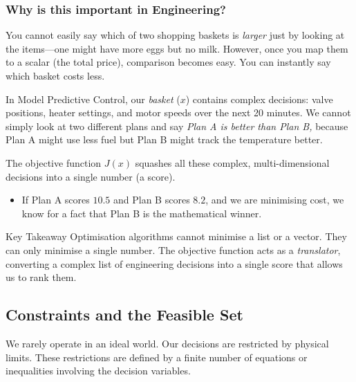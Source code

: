 \subsubsection*{Why is this important in Engineering?}

You cannot easily say which of two shopping baskets is \emph{larger} just by looking at the items—one might have more eggs but no milk. However, once you map them to a {scalar} (the total price), comparison becomes easy. You can instantly say which basket costs less.

In Model Predictive Control, our \emph{basket} ($x$) contains complex decisions: valve positions, heater settings, and motor speeds over the next 20 minutes. We cannot simply look at two different plans and say \emph{Plan A is better than Plan B,} because Plan A might use less fuel but Plan B might track the temperature better.

The objective function $J(x)$ squashes all these complex, multi-dimensional decisions into a single number (a score). 
\begin{itemize}
	\item If Plan A scores $10.5$ and Plan B scores $8.2$, and we are minimising cost, we know for a fact that {Plan B is the mathematical winner}.
\end{itemize}

\begin{notebox}{Key Takeaway}
	Optimisation algorithms cannot minimise a list or a vector. They can only minimise a single number. The objective function acts as a \emph{translator}, converting a complex list of engineering decisions into a single score that allows us to rank them.
\end{notebox}

\subsection{Constraints and the Feasible Set}


We rarely operate in an ideal world. Our decisions are restricted by physical limits. These restrictions are defined by a finite number of equations or inequalities involving the decision variables.

